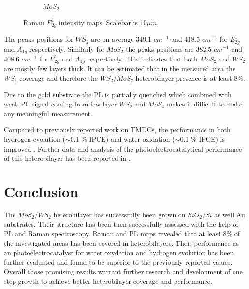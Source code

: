 \begin{figure}[H]
\begin{center}
\begin{subfigure}[b]{0.45\textwidth}
			\caption{$MoS_2$}
			\label{fig:HeterostructuresRamanIntensityEMoAu}
		\end{subfigure}
		\caption{Raman $E^1_{2g}$ intensity maps. Scalebar is 10$\mu m$.}
		\label{fig:HeterostructuresRamanIntensityEMaps}
	\end{center}
\end{figure}

The peaks positions for $WS_2$ are on average 349.1 $cm^{-1}$ and 418.5 $cm^{-1}$ for $E^1_{2g}$ and $A_{1g}$ respectively. Similarly for $MoS_2$ the peaks positions are 382.5 $cm^{-1}$ and 408.6 $cm^{-1}$ for $E^1_{2g}$ and $A_{1g}$ respectively. This indicates that both $MoS_2$ and $WS_2$ are mostly few layers thick. It can be estimated that in the measured area the $WS_2$ coverage and therefore the $WS_2$/$MoS_2$ heterobilayer presence is at least 8{\%}.

Due to the gold substrate the PL is partially quenched which combined with weak PL signal coming from few layer $WS_2$ and $MoS_2$ makes it difficult to make any meaningful measurement.

Compared to previously reported work on TMDCs, the performance in both hydrogen evolution ($\sim$0.1 \% IPCE) and water oxidation ($\sim$0.1 \% IPCE) is improved \cite{Fu2015}. Further data and analysis of the photoelectrocatalytical performance of this heterobilayer has been reported in \cite{Sherrell2019}.

\section{Conclusion}

The $MoS_2/WS_2$ heterobilayer has successfully been grown on $SiO_2/Si$ as well Au substrates. Their structure has been then successfully assessed with the help of PL and Raman spectroscopy. Raman and PL maps revealed that at least 8\% of the investigated areas has been covered in heterobilayers. Their performance as an photoelectrocatalyst for water oxydation and hydrogen evolution has been further evaluated and found to be superior to the previously reported values. Overall those promising results warrant further research and development of one step growth to achieve better heterobilayer coverage and performance.